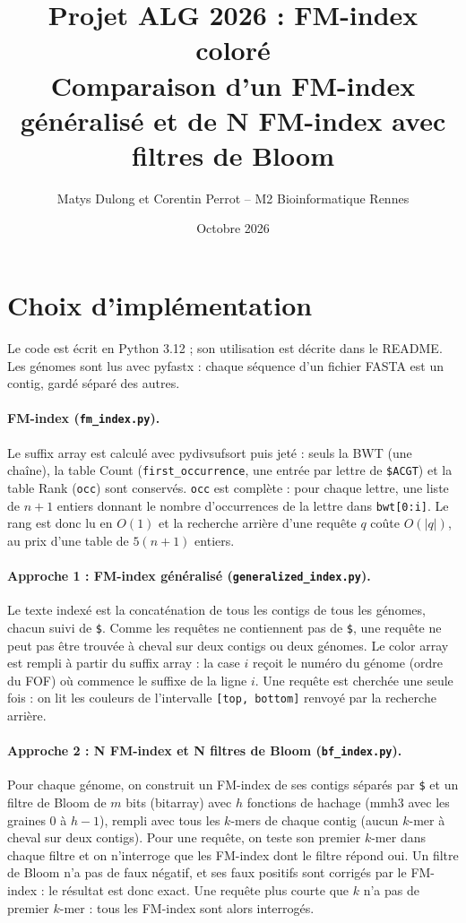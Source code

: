 \documentclass[11pt,a4paper]{article}
\title{Projet ALG 2026 : FM-index coloré\\
\large Comparaison d'un FM-index généralisé et de N FM-index avec filtres de Bloom}
\author{Matys Dulong et Corentin Perrot -- M2 Bioinformatique Rennes}
\date{Octobre 2026}
\begin{document}
\maketitle

\section{Choix d'implémentation}

Le code est écrit en Python 3.12 ; son utilisation est décrite dans le
README. Les génomes sont lus avec pyfastx : chaque séquence d'un fichier
FASTA est un contig, gardé séparé des autres.

\paragraph{FM-index (\texttt{fm\_index.py}).} Le suffix array est calculé avec
pydivsufsort puis jeté : seuls la BWT (une chaîne), la table Count
(\texttt{first\_occurrence}, une entrée par lettre de \texttt{\$ACGT}) et la
table Rank (\texttt{occ}) sont conservés. \texttt{occ} est complète : pour
chaque lettre, une liste de $n+1$ entiers donnant le nombre d'occurrences de
la lettre dans \texttt{bwt[0:i]}. Le rang est donc lu en $O(1)$ et la
recherche arrière d'une requête $q$ coûte $O(|q|)$, au prix d'une table de
$5(n+1)$ entiers.

\paragraph{Approche 1 : FM-index généralisé (\texttt{generalized\_index.py}).}
Le texte indexé est la concaténation de tous les contigs de tous les génomes,
chacun suivi de \texttt{\$}. Comme les requêtes ne contiennent pas de
\texttt{\$}, une requête ne peut pas être trouvée à cheval sur deux contigs ou
deux génomes. Le color array est rempli à partir du suffix array : la case $i$
reçoit le numéro du génome (ordre du FOF) où commence le suffixe de la ligne
$i$. Une requête est cherchée une seule fois : on lit les couleurs de
l'intervalle \texttt{[top, bottom]} renvoyé par la recherche arrière.

\paragraph{Approche 2 : N FM-index et N filtres de Bloom (\texttt{bf\_index.py}).}
Pour chaque génome, on construit un FM-index de ses contigs séparés par
\texttt{\$} et un filtre de Bloom de $m$ bits (bitarray) avec $h$ fonctions
de hachage (mmh3 avec les graines $0$ à $h-1$), rempli avec tous les
$k$-mers de chaque contig (aucun $k$-mer à cheval sur deux contigs). Pour une
requête, on teste son premier $k$-mer dans chaque filtre et on n'interroge
que les FM-index dont le filtre répond oui. Un filtre de Bloom n'a pas de
faux négatif, et ses faux positifs sont corrigés par le FM-index : le
résultat est donc exact. Une requête plus courte que $k$ n'a pas de premier
$k$-mer : tous les FM-index sont alors interrogés.
\end{document}

